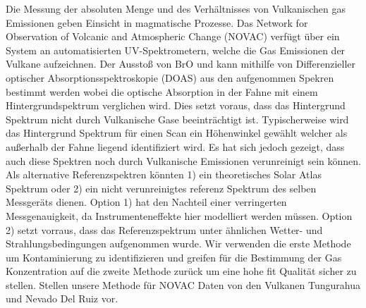 

Die Messung der absoluten Menge und des Verhältnisses von Vulkanischen gas Emissionen geben Einsicht in magmatische Prozesse. Das Network for Observation of Volcanic and Atmospheric Change (NOVAC) verfügt über ein System an automatisierten UV-Spektrometern, welche die Gas Emissionen der Vulkane aufzeichnen. Der Ausstoß von BrO und  kann mithilfe von Differenzieller optischer Absorptionsspektroskopie (DOAS) aus den aufgenommen Spekren bestimmt werden wobei die optische Absorption in der Fahne mit einem Hintergrundspektrum verglichen wird. Dies setzt voraus, dass das Hintergrund Spektrum nicht durch Vulkanische Gase beeinträchtigt ist. Typischerweise wird das Hintergrund Spektrum für einen Scan ein Höhenwinkel gewählt welcher als außerhalb der Fahne liegend identifiziert wird. Es hat sich jedoch gezeigt, dass auch diese Spektren noch durch Vulkanische Emissionen verunreinigt sein können. Als alternative Referenzspektren könnten 1) ein theoretisches Solar Atlas Spektrum oder 2) ein nicht verunreinigtes referenz Spektrum des selben Messgeräts dienen. Option 1) hat den Nachteil einer verringerten Messgenauigkeit, da Instrumenteneffekte hier modelliert werden müssen. Option 2) setzt vorraus, dass das Referenzspektrum unter ähnlichen Wetter- und Strahlungsbedingungen aufgenommen wurde. Wir verwenden die erste Methode um Kontaminierung zu identifizieren und greifen für die Bestimmung der Gas Konzentration auf die zweite Methode zurück um eine hohe fit Qualität sicher zu stellen. Stellen unsere Methode für NOVAC Daten von den Vulkanen Tungurahua und Nevado Del Ruiz vor.